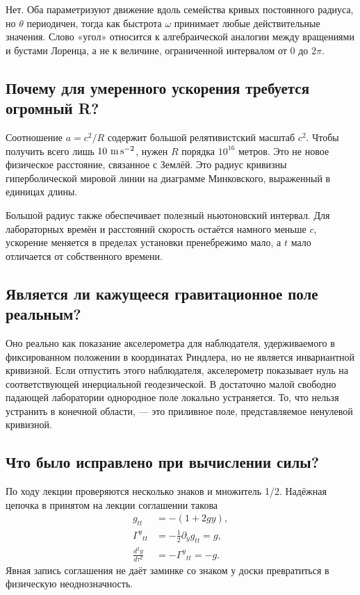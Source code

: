 Нет. Оба параметризуют движение вдоль семейства кривых постоянного радиуса, но \(\theta\) периодичен, тогда как быстрота \(\omega\) принимает любые действительные значения. Слово «угол» относится к алгебраической аналогии между вращениями и бустами Лоренца, а не к величине, ограниченной интервалом от \(0\) до \(2\pi\).

\subsection{Почему для умеренного ускорения требуется огромный R?}

Соотношение \(a=c^2/R\) содержит большой релятивистский масштаб \(c^2\). Чтобы получить всего лишь \(10\ {\rm m\,s^{-2}}\), нужен \(R\) порядка \(10^{16}\) метров. Это не новое физическое расстояние, связанное с Землёй. Это радиус кривизны гиперболической мировой линии на диаграмме Минковского, выраженный в единицах длины.

Большой радиус также обеспечивает полезный ньютоновский интервал. Для лабораторных времён и расстояний скорость остаётся намного меньше \(c\), ускорение меняется в пределах установки пренебрежимо мало, а \(t\) мало отличается от собственного времени.

\subsection{Является ли кажущееся гравитационное поле реальным?}

Оно реально как показание акселерометра для наблюдателя, удерживаемого в фиксированном положении в координатах Риндлера, но не является инвариантной кривизной. Если отпустить этого наблюдателя, акселерометр показывает нуль на соответствующей инерциальной геодезической. В достаточно малой свободно падающей лаборатории однородное поле локально устраняется. То, что нельзя устранить в конечной области, — это приливное поле, представляемое ненулевой кривизной.

\subsection{Что было исправлено при вычислении силы?}

По ходу лекции проверяются несколько знаков и множитель 1/2. Надёжная цепочка в принятом на лекции соглашении такова
\begin{equation}
\begin{aligned}
g_{tt}&=-(1+2gy),\\
\Gamma^y{}_{tt}&=-\frac12\partial_yg_{tt}=g,\\
\frac{d^2y}{d\tau^2}&=-\Gamma^y{}_{tt}=-g.
\end{aligned}
\end{equation}
Явная запись соглашения не даёт заминке со знаком у доски превратиться в физическую неоднозначность.

